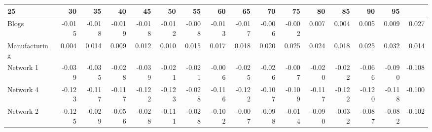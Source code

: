 \begin{tabular}{@{}lrrrrrrrrrrrrrrr@{}}
\toprule

25 & 30 & 35 & 40 & 45 & 50 & 55 & 60 & 65 & 70 & 75 & 80 & 85 & 90 & 95 \\\midrule

Blogs & -0.015 & -0.018 & -0.019 & -0.018 & -0.012 & -0.008 & -0.013 & -0.017 & -0.006 & -0.002 & 0.007 & 0.004 & 0.005 & 0.009 & 0.027 \\
Manufacturing & 0.004 & 0.014 & 0.009 & 0.012 & 0.010 & 0.015 & 0.017 & 0.018 & 0.020 & 0.025 & 0.024 & 0.018 & 0.025 & 0.032 & 0.014 \\
Network
1 & -0.039 & -0.035 & -0.028 & -0.039 & -0.021 & -0.021 & -0.006 & -0.025 & -0.026 & -0.007 & -0.020 & -0.022 & -0.066 & -0.090 & -0.108 \\
Network
4 & -0.123 & -0.117 & -0.117 & -0.122 & -0.123 & -0.028 & -0.116 & -0.122 & -0.107 & -0.109 & -0.117 & -0.122 & -0.120 & -0.118 & -0.100 \\
Network
2 & -0.125 & -0.029 & -0.056 & -0.028 & -0.111 & -0.028 & -0.102 & -0.007 & -0.098 & -0.014 & -0.090 & -0.032 & -0.087 & -0.082 & -0.102 \\

\bottomrule
\end{tabular}
